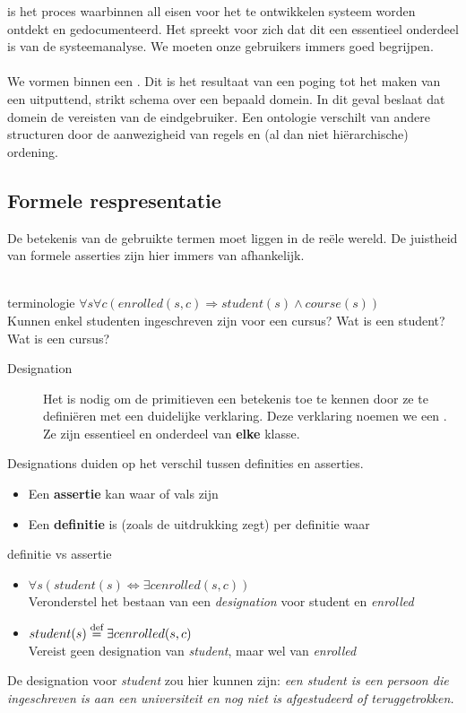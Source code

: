 \documentclass[../../main.tex]{subfiles}
\begin{document}
 is het proces waarbinnen all eisen voor het te ontwikkelen systeem worden ontdekt en gedocumenteerd. Het spreekt voor zich dat dit een essentieel onderdeel is van de systeemanalyse. We moeten onze gebruikers immers goed begrijpen.\\
\\
We vormen binnen  een . Dit is het resultaat van een poging tot het maken van een uitputtend, strikt schema over een bepaald domein. In dit geval beslaat dat domein de vereisten van de eindgebruiker. Een ontologie verschilt van andere structuren door de aanwezigheid van regels en (al dan niet hi\"erarchische) ordening.\\
\subsection{Formele respresentatie}
De betekenis van de gebruikte termen moet liggen in de re\"ele wereld. De juistheid van formele asserties zijn hier immers van afhankelijk.\\
\\
\begin{ex}{terminologie}
$\forall s \forall c (enrolled(s,c) \Rightarrow student(s) \wedge course(s))$\\
Kunnen enkel studenten ingeschreven zijn voor een cursus? Wat is een student? Wat is een cursus?
\end{ex}
\begin{description}
	\item[Designation] Het is nodig om de primitieven een betekenis toe te kennen door ze te defini\"eren met een duidelijke verklaring. Deze verklaring noemen we een . Ze zijn essentieel en onderdeel van \textbf{elke} klasse.
\end{description}
Designations duiden op het verschil tussen definities en asserties.
\begin{itemize}
	\item Een \textbf{assertie} kan waar of vals zijn
	\item Een \textbf{definitie} is (zoals de uitdrukking zegt) per definitie waar
\end{itemize}
\begin{ex}{definitie vs assertie}
\begin{itemize}
	\item $\forall s (student(s) \Leftrightarrow \exists c enrolled(s,c))$  \\
	Veronderstel het bestaan van een \textit{designation} voor student en \textit{enrolled}
	\item $student(s) \buildrel \text{def} \over = \exists c enrolled(s,c)$  \\
	Vereist geen designation van \textit{student}, maar wel van \textit{enrolled}
\end{itemize}
De designation voor \textit{student} zou hier kunnen zijn: \textit{een student is een persoon die ingeschreven is aan een universiteit en nog niet is afgestudeerd of teruggetrokken.}
\end{ex}
\end{document}
